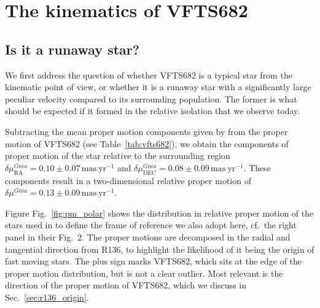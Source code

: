 \documentclass[apjl,twocolumn]{emulateapj}
\DeclareRobustCommand{\Figref}[1]{Fig.~\ref{#1}}
\DeclareRobustCommand{\Tabref}[1]{Table~\ref{#1}}
\DeclareRobustCommand{\Secref}[1]{Sec.~\ref{#1}}
\begin{document}
\section{The kinematics of VFTS682}
\label{sec:results}

\subsection{Is it a runaway star?}
\label{sec:runaway}
We first address the question of whether VFTS682 is a typical star
from the kinematic point of view, or whether it is a runaway star with
a significantly large peculiar velocity compared to its surrounding population. The former is what should
be expected if it formed in the relative isolation that we observe today.%

Subtracting the mean proper motion components given by
\citet{lennon:18} from the
proper motion of VFTS682 (see \Tabref{tab:vfts682}), we obtain the
components of proper motion of the star relative to the surrounding region
$\delta\mu_\mathrm{RA}^{Gaia} = 0.10 \pm 0.07\,\mathrm{mas\ yr^{-1}}$
and $\delta\mu_\mathrm{DEC}^{Gaia} = 0.08
\pm 0.09\,\mathrm{mas\ yr^{-1}}$. These components result in a
two-dimensional relative proper motion of $\delta \mu^{Gaia}=0.13\pm 0.09\,\mathrm{mas\
  yr^{-1}}$.

Figure \Figref{fig:pm_polar} shows the distribution in relative proper motion
of the stars used in \cite{lennon:18} to define the frame of reference
we also adopt here, cf.~the right panel in their Fig.~2. The
proper motions are decomposed in the radial and tangential direction
from R136, to highlight the likelihood of it being the origin of fast
moving stars. The plus sign marks VFTS682, which sits at the edge of
the proper motion distribution, but is not a clear outlier. Most
relevant is the direction of the proper motion of VFTS682, which we
discuss in \Secref{sec:r136_origin}.
\end{document}

